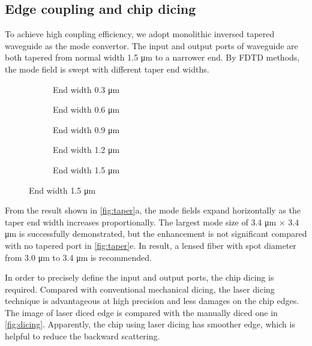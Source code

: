 \subsection{Edge coupling and chip dicing}

To achieve high coupling efficiency, we adopt monolithic inversed tapered waveguide as the mode convertor. The input and output ports of waveguide are both tapered from normal width 1.5 \si{\um} to a narrower end. By FDTD methods, the mode field is swept with different taper end widths.

\begin{figure}
	\centering
	\begin{subfigure}[b]{0.33\textwidth}
		
		\caption{End width 0.3 \si{\um}}
	\end{subfigure}\hfill
	\begin{subfigure}[b]{0.33\textwidth}
		
		\caption{End width 0.6 \si{\um}}
	\end{subfigure}\hfill
	\begin{subfigure}[b]{0.33\textwidth}
		
		\caption{End width 0.9 \si{\um}}
	\end{subfigure}
	\vfill
	\begin{subfigure}[b]{0.33\textwidth}
		
		\caption{End width 1.2 \si{\um}}
	\end{subfigure}
	\begin{subfigure}[b]{0.33\textwidth}
		
		\caption{End width 1.5 \si{\um}}
	\end{subfigure}
\label{fig:taper}
\end{figure}

From the result shown in \autoref{fig:taper}a, the mode fields expand horizontally as the taper end width increases proportionally. The largest mode size of 3.4 \si{\um} $\times$ 3.4 \si{\um} is successfully demonstrated, but the enhancement is not significant compared with no tapered port in \autoref{fig:taper}e. In result, a lensed fiber with spot diameter from 3.0 \si{\um} to 3.4 \si{\um} is recommended. 

In order to precisely define the input and output ports, the chip dicing is required.
Compared with conventional mechanical dicing,  the laser dicing technique is advantageous at high precision and less damages on the chip edges. The image of laser diced edge is compared with the manually diced one in \autoref{fig:dicing}. Apparently, the chip using laser dicing has smoother edge, which is helpful to reduce the backward scattering.

